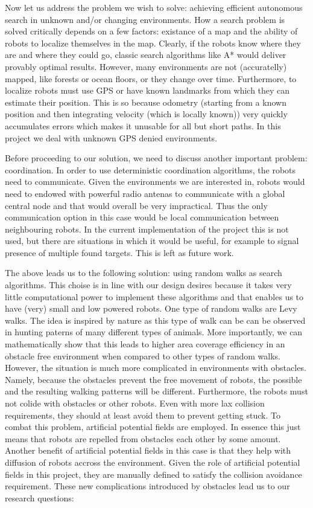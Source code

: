 Now let us address the problem we wish to solve:
achieving efficient autonomous search in unknown and/or changing environments.
How a search problem is solved critically depends on a few factors:
existance of a map and the ability of robots to localize themselves in the map.
Clearly, if the robots know where they are and where they could go, classic search
algorithms like A* would deliver provably optimal results.
However, many environments are not (accuratelly) mapped, like forests or ocean floors,
or they change over time. Furthermore, to localize robots must use GPS or
have known landmarks from which they can estimate their position.
This is so because odometry (starting from a known position and 
then integrating velocity (which is locally known)) very quickly accumulates errors which makes it 
unusable for all but short paths.
In this project we deal with unknown GPS denied environments.

Before proceeding to our solution, we need to discuss another important problem:
coordination. In order to use deterministic coordination algorithms, the robots
need to communicate. Given the environments we are interested in, robots would need to
endowed with powerful radio antenas to communicate with a global central node and
that would overall be very impractical. 
Thus the only communication option in this case would be local communication between neighbouring robots.
In the current implementation of the project this is not used, but there are situations in which
it would be useful, for example to signal presence of multiple found targets.
This is left as future work.



The above leads us to the following solution: using random walks as search algorithms.
This choise is in line with our design desires because it takes very little computational
power to implement these algorithms and that enables us to have (very) small and low powered robots.
One type of random walks are Levy walks. The idea is inspired by nature as 
this type of walk can be can be observed in hunting paterns of many different types of animals.
More importantly, we can mathematically show that this leads to higher area coverage efficiency 
in an obstacle free environment when compared to other types of random walks.
However, the situation is much more complicated in environments with obstacles. Namely, because
the obstacles prevent the free movement of robots, the possible and the resulting walking patterns will 
be different. 
Furthermore, the robots must not colide with obstacles or other robots. Even with more lax
collision requirements, they should at least
avoid them to prevent getting stuck. To combat this problem, artificial potential fields are employed.
In essence this just means that robots are repelled from obstacles each other by some amount.
Another benefit of artificial potential fields in this case is that they help with diffusion of
robots accross the environment. Given the role of artificial potential fields in this project, 
they are manually defined to satisfy the collision avoidance requirement.
These new complications introduced by obstacles lead us to our research questions:

